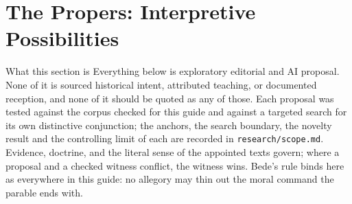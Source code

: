\sectionguard
\section*{The Propers: Interpretive Possibilities}

\begin{studybox}{What this section is}
Everything below is exploratory editorial and AI proposal. None of it is
sourced historical intent, attributed teaching, or documented reception, and
none of it should be quoted as any of those. Each proposal was tested against
the corpus checked for this guide and against a targeted search for its own
distinctive conjunction; the anchors, the search boundary, the novelty result
and the controlling limit of each are recorded in \texttt{research/scope.md}.
Evidence, doctrine, and the literal sense of the appointed texts govern; where
a proposal and a checked witness conflict, the witness wins. Bede's rule binds
here as everywhere in this guide: no allegory may thin out the moral command
the parable ends with.
\end{studybox}

